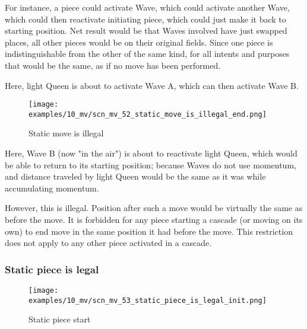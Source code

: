 For instance, a piece could activate Wave, which could activate another Wave, which
could then reactivate initiating piece, which could just make it back to starting
position. Net result would be that Waves involved have just swapped places, all other
pieces would be on their original fields. Since one piece is indistinguishable from
the other of the same kind, for all intents and purposes that would be the same, as
if no move has been performed.

Here, light Queen is about to activate Wave A, which can then activate Wave B.

\clearpage %

\vspace*{-2.1\baselineskip}
\noindent
\begin{figure}[!h]
\texttt{[image: examples/10\_mv/scn\_mv\_52\_static\_move\_is\_illegal\_end.png]}
\vspace*{-1.3\baselineskip}
\caption{Static move is illegal}
\label{fig:scn_mv_52_static_move_is_illegal_end}
\end{figure}

\vspace*{-0.4\baselineskip}
Here, Wave B (now "in the air") is about to reactivate light Queen, which would be
able to return to its starting position; because Waves do not use momentum, and
distance traveled by light Queen would be the same as it was while accumulating
momentum.

However, this is illegal. Position after such a move would be virtually the same
as before the move. It is forbidden for any piece starting a cascade (or moving
on its own) to end move in the same position it had before the move. This
restriction does not apply to any other piece activated in a cascade.

\clearpage %

\subsubsection*{Static piece is legal}
\label{sec:Miranda's veil/Wave/Cascading Waves/Static piece is legal}

\vspace*{-1.4\baselineskip}
\noindent
\begin{figure}[!h]
\texttt{[image: examples/10\_mv/scn\_mv\_53\_static\_piece\_is\_legal\_init.png]}
\vspace*{-1.3\baselineskip}
\caption{Static piece start}
\label{fig:scn_mv_53_static_piece_is_legal_init}
\end{figure}

